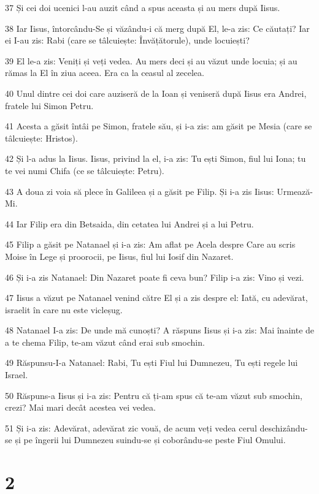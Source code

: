\par 37 Și cei doi ucenici l-au auzit când a spus aceasta și au mers după Iisus.
\par 38 Iar Iisus, întorcându-Se și văzându-i că merg după El, le-a zis: Ce căutați? Iar ei I-au zis: Rabi (care se tâlcuiește: Învățătorule), unde locuiești?
\par 39 El le-a zis: Veniți și veți vedea. Au mers deci și au văzut unde locuia; și au rămas la El în ziua aceea. Era ca la ceasul al zecelea.
\par 40 Unul dintre cei doi care auziseră de la Ioan și veniseră după Iisus era Andrei, fratele lui Simon Petru.
\par 41 Acesta a găsit întâi pe Simon, fratele său, și i-a zis: am găsit pe Mesia (care se tâlcuiește: Hristos).
\par 42 Și l-a adus la Iisus. Iisus, privind la el, i-a zis: Tu ești Simon, fiul lui Iona; tu te vei numi Chifa (ce se tâlcuiește: Petru).
\par 43 A doua zi voia să plece în Galileea și a găsit pe Filip. Și i-a zis Iisus: Urmează-Mi.
\par 44 Iar Filip era din Betsaida, din cetatea lui Andrei și a lui Petru.
\par 45 Filip a găsit pe Natanael și i-a zis: Am aflat pe Acela despre Care au scris Moise în Lege și proorocii, pe Iisus, fiul lui Iosif din Nazaret.
\par 46 Și i-a zis Natanael: Din Nazaret poate fi ceva bun? Filip i-a zis: Vino și vezi.
\par 47 Iisus a văzut pe Natanael venind către El și a zis despre el: Iată, cu adevărat, israelit în care nu este vicleșug.
\par 48 Natanael I-a zis: De unde mă cunoști? A răspuns Iisus și i-a zis: Mai înainte de a te chema Filip, te-am văzut când erai sub smochin.
\par 49 Răspunsu-I-a Natanael: Rabi, Tu ești Fiul lui Dumnezeu, Tu ești regele lui Israel.
\par 50 Răspuns-a Iisus și i-a zis: Pentru că ți-am spus că te-am văzut sub smochin, crezi? Mai mari decât acestea vei vedea.
\par 51 Și i-a zis: Adevărat, adevărat zic vouă, de acum veți vedea cerul deschizându-se și pe îngerii lui Dumnezeu suindu-se și coborându-se peste Fiul Omului.

\chapter{2}

